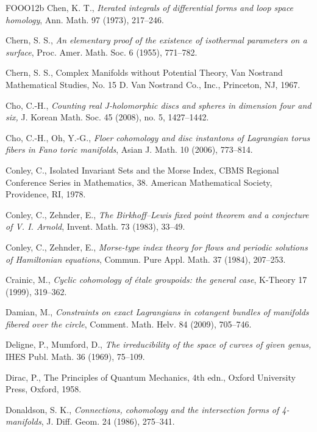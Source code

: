 \begin{thebibliography}{FOOO12b}
 Chen, K. T., \emph{Iterated integrals of diﬀerential forms and loop space
  homology}, Ann. Math. 97 (1973), 217–246.

 Chern, S. S., \emph{An elementary proof of the existence of isothermal
  param\-eters on a surface}, Proc. Amer. Math. Soc. 6 (1955), 771–782.

 Chern, S. S., Complex Manifolds without Potential Theory, Van Nos\-trand
  Mathematical Studies, No. 15 D. Van Nostrand Co., Inc., Princeton, NJ, 1967.

 Cho, C.-H., \emph{Counting real J-holomorphic discs and spheres in dimension four
  and six,} J. Korean Math. Soc. 45 (2008), no. 5, 1427–1442.

 Cho, C.-H., Oh, Y.-G., \emph{Floer cohomology and disc instantons of Lagrangian
  torus fibers in Fano toric manifolds}, Asian J. Math. 10 (2006), 773–814.

 Conley, C., Isolated Invariant Sets and the Morse Index, CBMS Regional Conference
  Series in Mathematics, 38. American Mathematical Society, Providence, RI, 1978.

 Conley, C., Zehnder, E., \emph{The Birkhoﬀ–Lewis fixed point theorem and a
  conjecture of V. I. Arnold}, Invent. Math. 73 (1983), 33–49.

 Conley, C., Zehnder, E., \emph{Morse-type index theory for flows and peri\-odic
  solutions of Hamiltonian equations}, Commun. Pure Appl. Math. 37 (1984), 207–253.

 Crainic, M., \emph{Cyclic cohomology of étale groupoids: the general case}, K-Theory
  17 (1999), 319–362.

 Damian, M., \emph{Constraints on exact Lagrangians in cotangent bundles of manifolds
  fibered over the circle}, Comment. Math. Helv. 84 (2009), 705–746.

 Deligne, P., Mumford, D., \emph{The irreducibility of the space of curves of given
  genus,} IHES Publ. Math. 36 (1969), 75–109.

 Dirac, P., The Principles of Quantum Mechanics, 4th edn., Oxford University Press,
  Oxford, 1958.

 Donaldson, S. K., \emph{Connections, cohomology and the intersection forms of
  4-manifolds}, J. Diﬀ. Geom. 24 (1986), 275–341.


\end{thebibliography}
